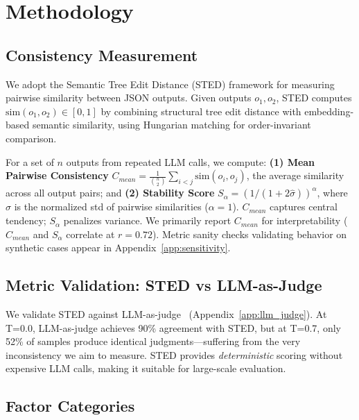 \documentclass[sigconf,anonymous,review]{acmart}
\begin{document}
\section{Methodology}
\label{sec:method}

\subsection{Consistency Measurement}

We adopt the Semantic Tree Edit Distance (STED) framework for measuring pairwise similarity between JSON outputs. Given outputs $o_1, o_2$, STED computes $\text{sim}(o_1, o_2) \in [0, 1]$ by combining structural tree edit distance with embedding-based semantic similarity, using Hungarian matching for order-invariant comparison.

For a set of $n$ outputs from repeated LLM calls, we compute: \textbf{(1) Mean Pairwise Consistency} $C_{mean} = \frac{1}{\binom{n}{2}} \sum_{i < j} \text{sim}(o_i, o_j)$, the average similarity across all output pairs; and \textbf{(2) Stability Score} $S_\alpha = (1/(1 + 2\hat{\sigma}))^\alpha$, where $\hat{\sigma}$ is the normalized std of pairwise similarities ($\alpha=1$). $C_{mean}$ captures central tendency; $S_\alpha$ penalizes variance. We primarily report $C_{mean}$ for interpretability ($C_{mean}$ and $S_\alpha$ correlate at $r=0.72$). Metric sanity checks validating behavior on synthetic cases appear in Appendix~\ref{app:sensitivity}.

\subsection{Metric Validation: STED vs LLM-as-Judge}

We validate STED against LLM-as-judge~\cite{zheng2024judging} (Appendix~\ref{app:llm_judge}). At T=0.0, LLM-as-judge achieves 90\% agreement with STED, but at T=0.7, only 52\% of samples produce identical judgments---suffering from the very inconsistency we aim to measure. STED provides \textit{deterministic} scoring without expensive LLM calls, making it suitable for large-scale evaluation.

\subsection{Factor Categories}
\end{document}

